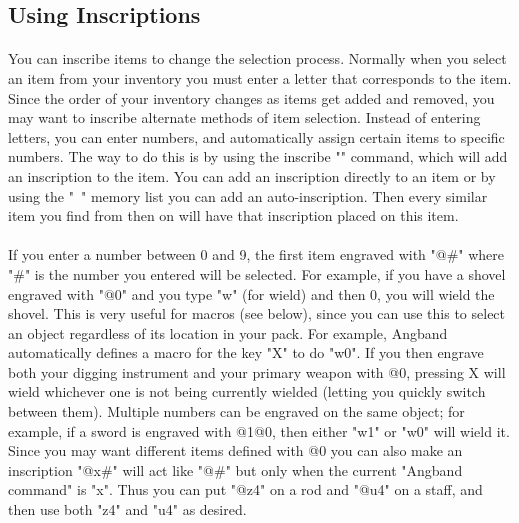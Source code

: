 \subsection{Using Inscriptions}
\paragraph{}You can inscribe items to change the selection process. Normally
when you select an item from your inventory you must enter a letter that
corresponds to the item. Since the order of your inventory changes as
items get added and removed, you may want to inscribe alternate methods of
item selection. Instead of entering letters, you can enter numbers, and
automatically assign certain items to specific numbers. The way to do this
is by using the inscribe "{}" command, which will add an inscription to the
item. You can add an inscription directly to an item or by using the "~"
memory list you can add an auto-inscription. Then every similar item you
find from then on will have that inscription placed on this item.

\paragraph{}If you enter a number between 0 and 9, the first item engraved
with "@\#" where "\#" is the number you entered will be selected. For example,
if you have a shovel engraved with "@0" and you type "w" (for wield) and
then 0, you will wield the shovel. This is very useful for macros (see
below), since you can use this to select an object regardless of its
location in your pack. For example, Angband automatically defines a macro
for the key "X" to do "w0". If you then engrave both your digging
instrument and your primary weapon with @0, pressing X will wield
whichever one is not being currently wielded (letting you quickly switch
between them). Multiple numbers can be engraved on the same object; for
example, if a sword is engraved with @1@0, then either "w1" or "w0" will
wield it. Since you may want different items defined with @0 you can also
make an inscription "@x\#" will act like "@\#" but only when the current
"Angband command" is "x". Thus you can put "@z4" on a rod and "@u4" on a
staff, and then use both "z4" and "u4" as desired.

